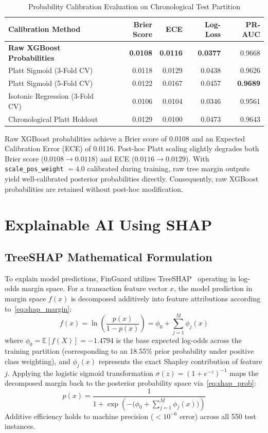 \documentclass[conference]{IEEEtran}
\begin{document}
\begin{table}[t]
\centering
\caption{Probability Calibration Evaluation on Chronological Test Partition}
\label{tab:calibration}
\small
\begin{tabular}{lrrrr}
\toprule
\textbf{Calibration Method} & \textbf{Brier Score} & \textbf{ECE} & \textbf{Log-Loss} & \textbf{PR-AUC} \\
\midrule
\textbf{Raw XGBoost Probabilities} & \textbf{0.0108} & \textbf{0.0116} & \textbf{0.0377} & 0.9668 \\
Platt Sigmoid (3-Fold CV) & 0.0118 & 0.0129 & 0.0438 & 0.9626 \\
Platt Sigmoid (5-Fold CV) & 0.0122 & 0.0167 & 0.0457 & \textbf{0.9689} \\
Isotonic Regression (3-Fold CV) & 0.0106 & 0.0104 & 0.0346 & 0.9561 \\
Chronological Platt Holdout & 0.0129 & 0.0100 & 0.0473 & 0.9643 \\
\bottomrule
\end{tabular}
\end{table}

Raw XGBoost probabilities achieve a Brier score of 0.0108 and an Expected Calibration Error (ECE) of 0.0116. Post-hoc Platt scaling slightly degrades both Brier score ($0.0108 \to 0.0118$) and ECE ($0.0116 \to 0.0129$). With \texttt{scale\_pos\_weight} $= 4.0$ calibrated during training, raw tree margin outputs yield well-calibrated posterior probabilities directly. Consequently, raw XGBoost probabilities are retained without post-hoc modification.

\section{Explainable AI Using SHAP}

\subsection{TreeSHAP Mathematical Formulation}
To explain model predictions, FinGuard utilizes TreeSHAP~\cite{lundberg2020local} operating in log-odds margin space. For a transaction feature vector $x$, the model prediction in margin space $f(x)$ is decomposed additively into feature attributions according to~\eqref{eq:shap_margin}:
\begin{equation}
f(x) = \ln \left( \frac{p(x)}{1 - p(x)} \right) = \phi_0 + \sum_{j=1}^{M} \phi_j(x)
\label{eq:shap_margin}
\end{equation}
where $\phi_0 = \mathbb{E}[f(X)] = -1.4794$ is the base expected log-odds across the training partition (corresponding to an 18.55\% prior probability under positive class weighting), and $\phi_j(x)$ represents the exact Shapley contribution of feature $j$. Applying the logistic sigmoid transformation $\sigma(z) = (1 + e^{-z})^{-1}$ maps the decomposed margin back to the posterior probability space via~\eqref{eq:shap_prob}:
\begin{equation}
p(x) = \frac{1}{1 + \exp\left(-\Big(\phi_0 + \sum_{j=1}^{M} \phi_j(x)\Big)\right)}
\label{eq:shap_prob}
\end{equation}
Additive efficiency holds to machine precision ($< 10^{-6}$ error) across all 550 test instances.
\end{document}
